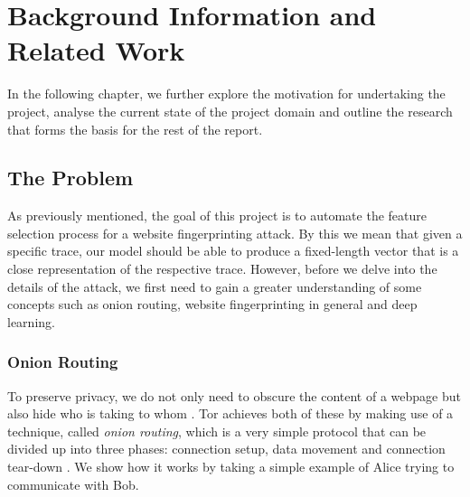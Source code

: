 \chapter{Background Information and Related Work}
In the following chapter, we further explore the motivation for undertaking the project,
analyse the current state of the project domain and outline the research that forms the basis for the rest of the report.

\section{The Problem}
As previously mentioned, the goal of this project is to automate the feature selection process for a website fingerprinting attack.
By this we mean that given a specific trace, our model should be able to produce a fixed-length vector that is a close representation of the respective trace.
However, before we delve into the details of the attack, we first need to gain a greater understanding of some concepts such as
onion routing, website fingerprinting in general and deep learning.

\subsection{Onion Routing}
To preserve privacy, we do not only need to obscure the content of a webpage but also hide who is taking to whom \cite{goldschlag1999onion}.
Tor achieves both of these by making use of a technique, called \textit{onion routing}, which is a very simple protocol that can be divided up into three phases:
connection setup, data movement and connection tear-down \cite{goldschlag1999onion}. We show how it works by taking a simple example of Alice trying to communicate with Bob.

